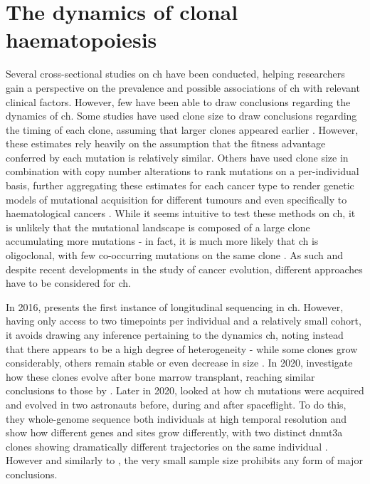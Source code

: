 \section{The dynamics of clonal haematopoiesis}

Several cross-sectional studies on \ac{ch} have been conducted, helping researchers gain a perspective on the prevalence and possible associations of \ac{ch} with relevant clinical factors. However, few have been able to draw conclusions regarding the dynamics of \ac{ch}. Some studies have used clone size to draw conclusions regarding the timing of each clone, assuming that larger clones appeared earlier \cite{Li2018-vz}. However, these estimates rely heavily on the assumption that the fitness advantage conferred by each mutation is relatively similar. Others have used clone size in combination with copy number alterations to rank mutations on a per-individual basis, further aggregating these estimates for each cancer type to render genetic models of mutational acquisition for different tumours \cite{Jolly2018-yb,Gerstung2020-kf} and even specifically to haematological cancers \cite{Papaemmanuil2013-yt}. While it seems intuitive to test these methods on \ac{ch}, it is unlikely that the mutational landscape is composed of a large clone accumulating more mutations - in fact, it is much more likely that \ac{ch} is oligoclonal, with few co-occurring mutations on the same clone \cite{Miles2020-fz,Mitchell2021-zl,Saiki2021-sq}. As such and despite recent developments in the study of cancer evolution, different approaches have to be considered for \ac{ch}.

In 2016,  presents the first instance of longitudinal sequencing in \ac{ch}. However, having only access to two timepoints per individual and a relatively small cohort, it avoids drawing any inference pertaining to the dynamics \ac{ch}, noting instead that there appears to be a high degree of heterogeneity - while some clones grow considerably, others remain stable or even decrease in size \cite{Young2016-du}. In 2020,  investigate how these clones evolve after bone marrow transplant, reaching similar conclusions to those by  \cite{Suarez-Gonzalez2020-hn}. Later in 2020,  looked at how \ac{ch} mutations were acquired and evolved in two astronauts before, during and after spaceflight. To do this, they whole-genome sequence both individuals at high temporal resolution and show how different genes and sites grow differently, with two distinct \ac{dnmt3a} clones showing dramatically different trajectories on the same individual \cite{Mencia-Trinchant2020-eb}. However and similarly to \cite{Young2016-du}, the very small sample size prohibits any form of major conclusions.

